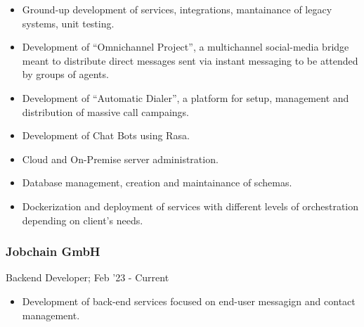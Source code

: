 \documentclass[letterpaper]{article}
\begin{document}
\begin{itemize}
  \item Ground-up development of services, integrations, mantainance of legacy systems, unit testing.
  \item Development of ``Omnichannel Project'', a multichannel social-media bridge meant to distribute direct messages sent via instant messaging to be attended by groups of agents.
  \item Development of ``Automatic Dialer'', a platform for setup, management and distribution of massive call campaings.
  \item Development of Chat Bots using Rasa.
  \item Cloud and On-Premise server administration.
  \item Database management, creation and maintainance of schemas.
  \item Dockerization and deployment of services with different levels of orchestration depending on client's needs.
\end{itemize}

\subsubsection{Jobchain GmbH}

Backend Developer; Feb '23 - Current

\begin{itemize}
  \item Development of back-end services focused on end-user messagign and contact management.
\end{itemize}
\end{document}
